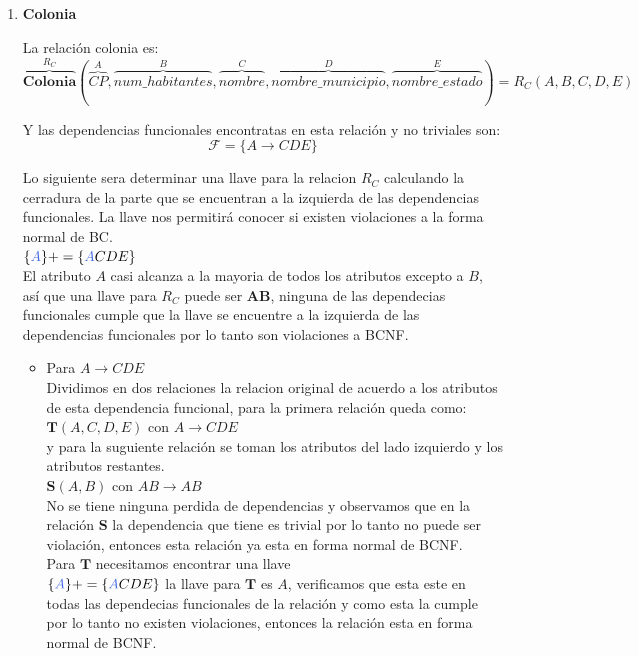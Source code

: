 \documentclass[10pt]{article}
\begin{document}
    \begin{enumerate}
    	\item \textbf{Colonia}
    	
    	La relación colonia es:
    	\[\overbrace{{\textbf{Colonia}}}^{\textbf{$R_{C}$}} 
    	(
    	\overbrace{CP}^{A}, \overbrace{num\_habitantes}^{B},
    	\overbrace{nombre}^{C}, \overbrace{nombre\_municipio}^{D}, \overbrace{nombre\_estado}^{E}
    	)
    	= 
    	\textbf{$R_C$}(A,B,C,D,E)
    	\]
    	
    	Y las dependencias funcionales encontratas en esta relación  y no triviales son:\\
    	\[\mathcal{F} = \{A \rightarrow CDE\}\]
    	
    	Lo siguiente sera determinar una llave para la relacion $R_C$ calculando la cerradura de la parte que se encuentran a la izquierda de las dependencias funcionales. La llave nos permitirá conocer si existen violaciones a la forma normal de BC.\\
    	
    	$\{\textcolor{RoyalBlue}{A}\}+= \{\textcolor{RoyalBlue}{A}CDE\}$\\
    	
    	El atributo $A$ casi alcanza a la mayoria de todos los atributos excepto a $B$, así que una llave para $R_C$ puede ser \textbf{AB}, ninguna de las dependecias funcionales cumple que la llave se encuentre a la izquierda de las dependencias funcionales por lo tanto son violaciones a BCNF.\\
    	\begin{itemize}
    		\item Para $A \rightarrow CDE$\\
    		Dividimos en dos relaciones la relacion original de acuerdo a los atributos de esta dependencia funcional, para la primera relación queda como:\\
    		
    		$\textbf{T}(A,C,D,E)$ con $A \rightarrow CDE$\\
    		
    		y para la suguiente relación se toman los atributos del lado izquierdo y los atributos restantes.\\
    		
    		$\textbf{S}(A,B)$ con $AB \rightarrow AB$\\ 
    		
    		No se tiene ninguna perdida de dependencias y observamos que en la relación
    		$\textbf{S}$ la dependencia que tiene es trivial por lo tanto no puede ser violación, entonces esta relación ya esta en forma normal de BCNF. \\
    		Para $\textbf{T}$  necesitamos encontrar una llave\\
    		$\{\textcolor{RoyalBlue}{A}\}+= \{\textcolor{RoyalBlue}{A}CDE\}$ la llave para $\textbf{T}$ es $A$, verificamos que esta este en todas las dependecias funcionales de la relación y como esta la cumple por lo tanto no existen violaciones, entonces la relación esta en forma normal de BCNF.\\
    	\end{itemize}
    

\end{enumerate}
\end{document}
